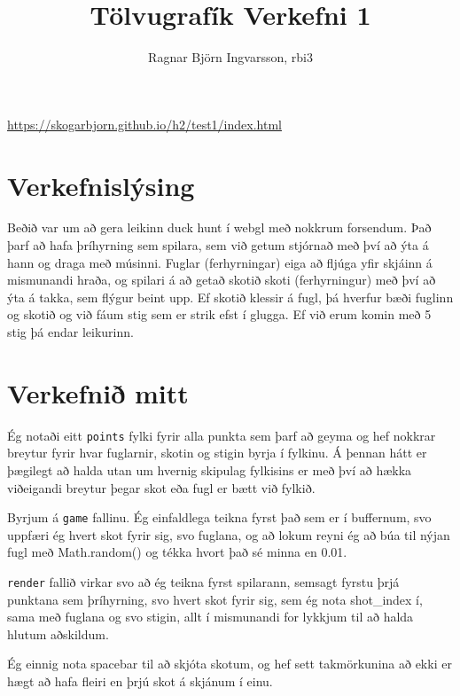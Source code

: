 \documentclass{article}
\title{Tölvugrafík Verkefni 1}
\author{Ragnar Björn Ingvarsson, rbi3}
\begin{document}
\renewcommand\thepage{}
	
	\maketitle

	\begin{center}\url{https://skogarbjorn.github.io/h2/test1/index.html}\end{center}
	\newpage
	\setcounter{page}{1}
	\renewcommand\thepage{\arabic{page}}

	\part{Verkefnislýsing}

	Beðið var um að gera leikinn duck hunt í webgl með nokkrum forsendum. 
	Það þarf að hafa þríhyrning sem spilara, sem við getum stjórnað með 
	því að ýta á hann og draga með músinni. Fuglar (ferhyrningar) eiga að 
	fljúga yfir skjáinn á mismunandi hraða, og spilari á að getað skotið 
	skoti (ferhyrningur) með því að ýta á takka, sem flýgur beint upp. 
	Ef skotið klessir á fugl, þá hverfur bæði fuglinn og skotið og við 
	fáum stig sem er strik efst í glugga. Ef við erum komin með 5 stig þá 
	endar leikurinn.

	\part{Verkefnið mitt}

	Ég notaði eitt \texttt{points} fylki fyrir alla punkta sem þarf að 
	geyma og hef nokkrar breytur fyrir hvar fuglarnir, skotin og stigin 
	byrja í fylkinu. Á þennan hátt er þægilegt að halda utan um hvernig 
	skipulag fylkisins er með því að hækka viðeigandi breytur þegar skot 
	eða fugl er bætt við fylkið.

	Byrjum á \texttt{game} fallinu. Ég einfaldlega teikna fyrst það sem 
	er í buffernum, svo uppfæri ég hvert skot fyrir sig, svo fuglana, og 
	að lokum reyni ég að búa til nýjan fugl með Math.random() og tékka 
	hvort það sé minna en 0.01.

	\texttt{render} fallið virkar svo að ég teikna fyrst spilarann, semsagt 
	fyrstu þrjá punktana sem þríhyrning, svo hvert skot fyrir sig, 
	sem ég nota shot\_index í, sama með fuglana og svo stigin, allt í 
	mismunandi for lykkjum til að halda hlutum aðskildum.

	Ég einnig nota spacebar til að skjóta skotum, og hef sett takmörkunina 
	að ekki er hægt að hafa fleiri en þrjú skot á skjánum í einu.
\end{document}
